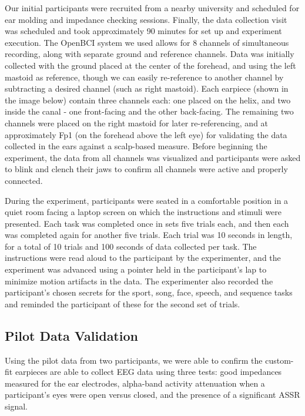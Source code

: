 \documentclass[11pt]{article}
\begin{document}
Our initial participants were recruited from a nearby university and scheduled for ear molding
and impedance checking sessions. Finally, the data collection visit was scheduled and took
approximately 90 minutes for set up and experiment execution. The OpenBCI system we used
allows for 8 channels of simultaneous recording, along with separate ground and reference channels.
Data was initially collected with the ground placed at the center of the forehead, and using the left
mastoid as reference, though we can easily re-reference to another channel by subtracting a desired
channel (such as right mastoid). Each earpiece (shown in the image below) contain three channels each: 
one placed on the helix, and two inside the canal - one front-facing and the other back-facing. The remaining
two channels were placed on the right mastoid for later re-referencing, and at approximately Fp1 (on the 
forehead above the left eye) for validating the data collected in the ears against a scalp-based measure. 
Before beginning the experiment, the data from all channels was visualized and participants were asked to
blink and clench their jaws to confirm all channels were active and properly connected.

During the experiment, participants were seated in a comfortable position in a quiet room facing a laptop screen on which the
instructions and stimuli were presented. Each task was completed once in sets five trials each, and then
each was completed again for another five trials. Each trial was 10 seconds in length, for a total of 10 trials and 
100 seconds of data collected per task. The instructions were read aloud to the participant by the experimenter, and
the experiment was advanced using a pointer held in the participant's lap to minimize motion artifacts in the data.  
The experimenter also recorded the participant's chosen secrets for the sport, song, face, speech, and sequence
 tasks and reminded the participant of these for the second set of trials.

\subsection{Pilot Data Validation}
\label{sec:org28f05cd}

Using the pilot data from two participants, we were able to confirm the custom-fit earpieces are able to collect EEG
data using three tests: good impedances measured for the ear electrodes, alpha-band activity attenuation when a
participant's eyes were open versus closed, and the presence of a significant ASSR signal.
\end{document}
